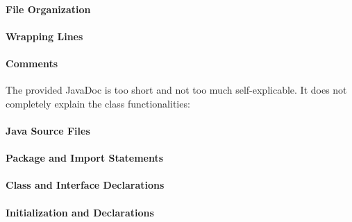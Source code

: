 \paragraph{File Organization}
\begin{itemize}
\end{itemize}

\paragraph{Wrapping Lines}
\begin{itemize}
\end{itemize}

\paragraph{Comments}
\begin{itemize}
		The provided JavaDoc is too short and not too much self-explicable.
		It does not completely explain the class functionalities:
\end{itemize}

\paragraph{Java Source Files}
\begin{itemize}
\end{itemize}

\paragraph{Package and Import Statements}
\begin{itemize}
\end{itemize}

\paragraph{Class and Interface Declarations}
\begin{itemize}
\end{itemize}

\paragraph{Initialization and Declarations}
\begin{itemize}
\end{itemize}


